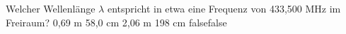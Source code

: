     {Welcher Wellenlänge $\lambda$ entspricht in etwa eine Frequenz von 433,500 MHz im Freiraum?}
    {0,69 m}
    {58,0 cm}
    {2,06 m}
    {198 cm}
    {false}{false}
